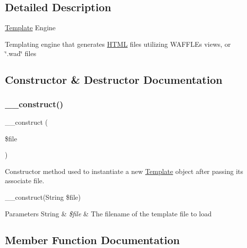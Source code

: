 \subsection{Detailed Description}
\hyperlink{class_w_a_f_f_l_e_1_1_framework_1_1_engines_1_1_template}{Template} Engine

Templating engine that generates \hyperlink{class_w_a_f_f_l_e_1_1_framework_1_1_engines_1_1_h_t_m_l}{H\+T\+ML} files utilizing W\+A\+F\+F\+LE\textquotesingle{}s view\textquotesingle{}s, or \char`\"{}.\+wad\char`\"{} files 

\subsection{Constructor \& Destructor Documentation}
\mbox{\label{class_w_a_f_f_l_e_1_1_framework_1_1_engines_1_1_template_a8ef77288a5f940c68ebc57fdf0102078}} 
\subsubsection{\texorpdfstring{\+\_\+\+\_\+construct()}{\_\_construct()}}
{\footnotesize\ttfamily \+\_\+\+\_\+construct (\begin{DoxyParamCaption}\item[{}]{\$file }\end{DoxyParamCaption})}

Constructor method used to instantiate a new \hyperlink{class_w_a_f_f_l_e_1_1_framework_1_1_engines_1_1_template}{Template} object after passing its associate file.

\+\_\+\+\_\+construct(String \$file)


\begin{DoxyParams}[1]{Parameters}
String & {\em \$file} & The filename of the template file to load \\
\hline
\end{DoxyParams}


\subsection{Member Function Documentation}
\mbox{\label{class_w_a_f_f_l_e_1_1_framework_1_1_engines_1_1_template_a35932dacc685dbaaf413695f6dd67f36}} 

